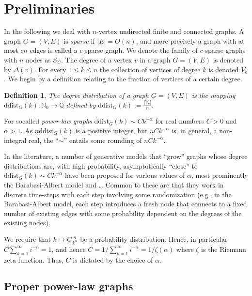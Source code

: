 \documentclass{article}
\newtheorem{definition}{Definition}
\theoremstyle{remark}
\begin{document}
\section{Preliminaries}
In the following we deal with $n$-vertex undirected finite and connected graphs.
A graph $G=(V,E)$ is \emph{sparse} if $\vert E \vert = O(n)$, and more precisely a graph with at most $cn$ edges is called a $c$-sparse graph.
We  denote the family of $c$-sparse graphs with $n$ nodes as   $\mathcal{S}_C$.
The degree of a vertex $v$ in a graph $G=(V,E)$ is denoted by $\Delta(v)$.
For every $1 \leq k \leq n$  the collection of vertices of degree $k$ is denoted $V_k$.
We begin by a definition relating to the fraction of vertices of a certain degree.
\begin{definition}
The \emph{degree distribution} of a graph $G = (V,E)$ is the mapping 
 $\mathrm{ddist}_G (k) : \mathbb{N}_0 \longrightarrow \mathbb{Q}$
defined by $\mathrm{ddist}_G (k) := 
\frac{\vert V_k \vert} {n}.$
\end{definition}

For socalled \emph{power-law graphs}  $\mathrm{ddist}_G (k) \sim C k^{-\alpha}$
for real numbers $C > 0$ and $\alpha > 1$. As $n \mathrm{ddist}_G (k)$ is a positive integer,
but $n C k^{-\alpha}$ is, in general, a non-integral real, the ``$\sim$'' entails some rounding
of $n C k^{-\alpha}$.

 
In the literature, a number of generative models that ``grow'' graphs whose degree distributions are, with high probability, asymptotically ``close''  to $\mathrm{ddist}_G (k) \sim C k^{-\alpha}$ have been proposed for various values of
$\alpha$, most prominently the Barabasi-Albert model \cite{} and \ldots 
 Common to these are that they work in discrete time-steps with each step
 involving some randomization (e.g., in the Barabasi-Albert model, each step introduces a fresh node that connects
 to a fixed number of existing edges with some probability dependent on the degrees of the existing nodes). 
 

 
We require that $k \mapsto C \frac{n}{k^\alpha}$ be a probability distribution. Hence, in particular
$C \sum_{k=1}^\infty i^{-\alpha} = 1$, and hence $C = 1/\sum_{k=1}^\infty i^{-\alpha} = 1/\zeta(\alpha)$ where
$\zeta$ is the Riemann zeta function.
Thus, $C$ is dictated by the choice of $\alpha$.
   

 \subsection{Proper power-law graphs}
 
\end{document}
